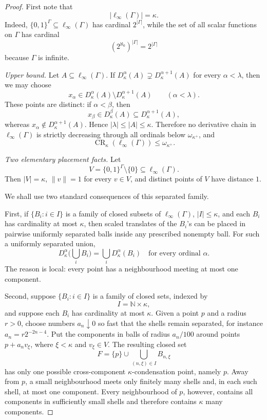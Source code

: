 \documentclass[11pt]{article}
\newcommand{\card}[1]{\left|#1\right|}
\newcommand{\CR}{\operatorname{CR}}
\begin{document}
\begin{proof}
First note that
\[
\card{\ell_\infty(\Gamma)}=\kappa.
\]
Indeed, \(\{0,1\}^{\Gamma}\subseteq \ell_\infty(\Gamma)\) has cardinal
\(2^{\card{\Gamma}}\), while the set of all scalar functions on \(\Gamma\) has
cardinal
\[
(2^{\aleph_0})^{\card{\Gamma}}=2^{\card{\Gamma}}
\]
because \(\Gamma\) is infinite.

\medskip
\noindent\emph{Upper bound.}
Let \(A\subseteq \ell_\infty(\Gamma)\).  If
\(D_\kappa^\alpha(A)\supsetneq D_\kappa^{\alpha+1}(A)\) for every
\(\alpha<\lambda\), then we may choose
\[
x_\alpha\in D_\kappa^\alpha(A)\setminus D_\kappa^{\alpha+1}(A)
\qquad(\alpha<\lambda).
\]
These points are distinct: if \(\alpha<\beta\), then
\[
x_\beta\in D_\kappa^\beta(A)\subseteq D_\kappa^{\alpha+1}(A),
\]
whereas \(x_\alpha\notin D_\kappa^{\alpha+1}(A)\).  Hence
\(\card{\lambda}\leq \card{A}\leq \kappa\).  Therefore no derivative chain in
\(\ell_\infty(\Gamma)\) is strictly decreasing through all ordinals below
\(\omega_{\kappa^+}\), and
\[
\CR_\kappa(\ell_\infty(\Gamma))\leq \omega_{\kappa^+}.
\]

\medskip
\noindent\emph{Two elementary placement facts.}
Let
\[
V=\{0,1\}^{\Gamma}\setminus\{0\}\subseteq \ell_\infty(\Gamma).
\]
Then \(\card{V}=\kappa\), \(\|v\|=1\) for every \(v\in V\), and distinct
points of \(V\) have distance \(1\).

We shall use two standard consequences of this separated family.

First, if \(\{B_i:i\in I\}\) is a family of closed subsets of
\(\ell_\infty(\Gamma)\), \(\card{I}\leq\kappa\), and each \(B_i\) has
cardinality at most \(\kappa\), then scaled translates of the \(B_i\)'s can be
placed in pairwise uniformly separated balls inside any prescribed nonempty
ball.  For such a uniformly separated union,
\[
D_\kappa^\alpha\Big(\bigcup_i B_i\Big)=\bigcup_i D_\kappa^\alpha(B_i)
\quad\text{for every ordinal }\alpha. \tag{1}
\]
The reason is local: every point has a neighbourhood meeting at most one
component.

Second, suppose \(\{B_i:i\in I\}\) is a family of closed sets, indexed by
\[
I=\mathbb N\times\kappa,
\]
and suppose each \(B_i\) has cardinality at most \(\kappa\).  Given a point
\(p\) and a radius \(r>0\), choose numbers \(a_n\downarrow 0\) so fast that
the shells remain separated, for instance \(a_n=r2^{-2n-4}\).  Put the
components in balls of radius \(a_n/100\) around points \(p+a_nv_\xi\), where
\(\xi<\kappa\) and \(v_\xi\in V\).  The resulting closed set
\[
F=\{p\}\cup \bigcup_{(n,\xi)\in I} B_{n,\xi}
\]
has only one possible cross-component \(\kappa\)-condensation point, namely
\(p\).  Away from \(p\), a small neighbourhood meets only finitely many shells
and, in each such shell, at most one component.  Every neighbourhood of \(p\),
however, contains all components in sufficiently small shells and therefore
contains \(\kappa\) many components.


\end{proof}
\end{document}
